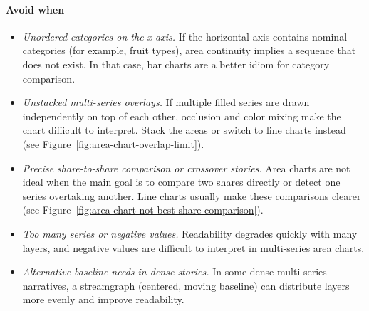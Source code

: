 \paragraph{Avoid when}
\begin{itemize}
    \item \textit{Unordered categories on the x-axis.} If the horizontal axis contains nominal categories (for example, fruit types), area continuity implies a sequence that does not exist. In that case, bar charts are a better idiom for category comparison.
    \item \textit{Unstacked multi-series overlays.} If multiple filled series are drawn independently on top of each other, occlusion and color mixing make the chart difficult to interpret. Stack the areas or switch to line charts instead (see Figure~\ref{fig:area-chart-overlap-limit}).
    \item \textit{Precise share-to-share comparison or crossover stories.} Area charts are not ideal when the main goal is to compare two shares directly or detect one series overtaking another. Line charts usually make these comparisons clearer (see Figure~\ref{fig:area-chart-not-best-share-comparison}).
    \item \textit{Too many series or negative values.} Readability degrades quickly with many layers, and negative values are difficult to interpret in multi-series area charts.
    \item \textit{Alternative baseline needs in dense stories.} In some dense multi-series narratives, a streamgraph (centered, moving baseline) can distribute layers more evenly and improve readability.
\end{itemize}




